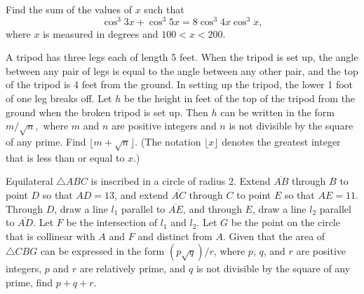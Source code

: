 \documentclass[11pt]{article}
\theoremstyle{definition}
\begin{document}
\begin{question}[name={2006 AIME I, \href{https://artofproblemsolving.com/community/c4p449170}{Problem 12}}]
	Find the sum of the values of $x$ such that $$\cos^3 3x+ \cos^3 5x = 8 \cos^3 4x \cos^3 x,$$ where $x$ is measured in degrees and $100< x< 200$.
\end{question}


%	













\begin{question}[name={2006 AIME I, \href{https://artofproblemsolving.com/community/c4p449183}{Problem 14}}]
	A tripod has three legs each of length 5 feet. When the tripod is set up, the angle between any pair of legs is equal to the angle between any other pair, and the top of the tripod is 4 feet from the ground. In setting up the tripod, the lower 1 foot of one leg breaks off. Let $h$ be the height in feet of the top of the tripod from the ground when the broken tripod is set up. Then $h$ can be written in the form $ m/{\sqrt{n}},$ where $m$ and $n$ are positive integers and $n$ is not divisible by the square of any prime. Find $\lfloor m+\sqrt{n}\rfloor.$ (The notation $\lfloor x\rfloor$ denotes the greatest integer that is less than or equal to $x$.)
\end{question}


%	








\begin{question}[name={2006 AIME II, \href{https://artofproblemsolving.com/community/c4p464986}{Problem 12}}]
	Equilateral $\triangle ABC$ is inscribed in a circle of radius 2. Extend $\overline{AB}$ through $B$ to point $D$ so that $AD=13$, and extend $\overline{AC}$ through $C$ to point $E$ so that $AE=11$. Through $D$, draw a line $l_1$ parallel to $\overline{AE}$, and through $E$, draw a line ${l}_2$ parallel to $\overline{AD}$. Let $F$ be the intersection of ${l}_1$ and ${l}_2$. Let $G$ be the point on the circle that is collinear with $A$ and $F$ and distinct from $A$. Given that the area of $\triangle CBG$ can be expressed in the form $({p\sqrt{q}})/{r}$, where $p$, $q$, and $r$ are positive integers, $p$ and $r$ are relatively prime, and $q$ is not divisible by the square of any prime, find $p+q+r$.
\end{question}
\end{document}
